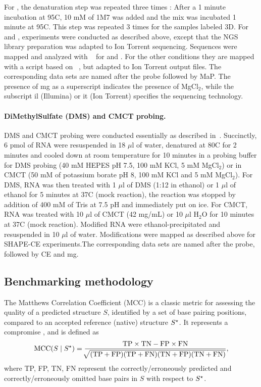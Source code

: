 \documentclass[a4,center,fleqn]{NAR}
\begin{document}
For \OneMSevILUThreeMg, the denaturation step was repeated three times : After a 1 minute incubation at 95\degree{}C, 10 mM of 1M7 was added and the mix was incubated 1 minute at 95\degree{}C. This step was repeated 3 times for the samples labeled 3D. For \NMIA and \NMIAMg, experiments were conducted as described above, except that the NGS library preparation was adapted to Ion Torrent sequencing. Sequences were mapped and analyzed with ~\cite{Busan2018} for \OneMSevILUThreeMg and \OneMSevILUThreeMg. For the other conditions they are mapped with a script based on ~\cite{Smola2015}, but adapted to Ion Torrent output files. The corresponding data sets are named after the probe followed by {\sc MaP}. The presence of {\sc mg} as a superscript indicates the presence of MgCl$_\text{2}$, while the subscript {\sc il} (Illumina) or {\sc it} (Ion Torrent) specifies the sequencing technology. 


\paragraph{DiMethylSulfate (DMS) and CMCT probing.}
DMS and CMCT probing were conducted essentially as described in~\cite{Weill2004,James2008}. Succinctly, 6 pmol of RNA were resuspended in 18 $\mu$l of water, denatured at 80\degree{}C for 2 minutes and cooled down at room temperature for 10 minutes in a probing buffer for DMS probing (40 mM HEPES pH 7.5, 100 mM KCl, 5 mM MgCl$_\text{2}$) or in CMCT (50 mM of potassium borate pH 8, 100 mM KCl and 5 mM MgCl$_\text{2}$). For DMS, RNA was then treated with 1 $\mu$l of DMS (1:12 in ethanol) or 1 $\mu$l of ethanol for 5 minutes at 37\degree{}C (mock reaction), the reaction was stopped by addition of 400 mM of Tris at 7.5 pH and immediately put on ice. For CMCT,  RNA was treated with 10 $\mu$l of CMCT (42 mg/mL) or 10 $\mu$l H$_\text{2}$O for 10 minutes at 37\degree{}C (mock reaction). Modified RNA were ethanol-precipitated and resuspended in 10 $\mu$l of water. Modifications were mapped as described above for SHAPE-CE experiments.The corresponding data sets are named after the probe, followed by {CE} and {\sc mg}.


\subsection*{Benchmarking methodology}

The Matthews Correlation Coefficient (MCC) is a classic metric for assessing the quality of a predicted structure $S$, identified by a set of base pairing positions, compared to an accepted reference (native) structure ${S^{\star}}$. It represents a compromise , and is defined as 
$$\text{MCC}(S\mid {S^{\star}})=\frac{\text{TP} \times \text{TN} -\text{FP} \times \text{FN}}{\sqrt[]{(\text{TP}+\text{FP})(\text{TP}+\text{FN})(\text{TN}+\text{FP})(\text{TN}+\text{FN})}},$$
where TP, FP, TN, FN represent the correctly/erroneously predicted and correctly/erroneously omitted base pairs in $S$ with respect to ${S^{\star}}$.
\end{document}
